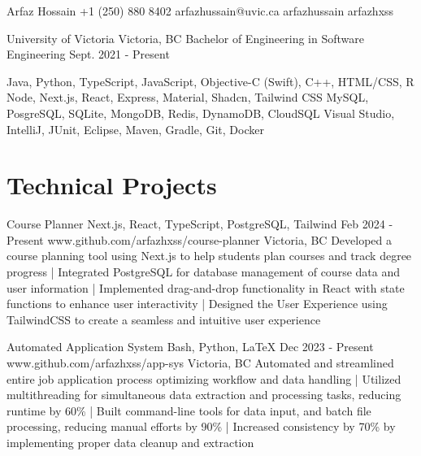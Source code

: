 \documentclass[a4paper,10pt]{article}
\begin{document}
\header
{Arfaz Hossain}				%
{+1 (250) 880 8402}			%
{arfazhussain@uvic.ca} 			%
{arfazhussain} 				%
{arfazhxss} 				%

\education
{University of Victoria}
{Victoria, BC}
{Bachelor of Engineering in Software Engineering}
{Sept. 2021 - Present}

\technicalskills
{Java, Python, TypeScript, JavaScript, Objective-C (Swift), C++, HTML/CSS, R}
{Node, Next.js, React, Express, Material, Shadcn, Tailwind CSS}
{MySQL, PosgreSQL, SQLite, MongoDB, Redis, DynamoDB, CloudSQL}
{Visual Studio, IntelliJ, JUnit, Eclipse, Maven, Gradle, Git, Docker}

\section{Technical Projects}
\projectentry
{Course Planner}
{Next.js, React, TypeScript, PostgreSQL, Tailwind}
{Feb 2024 - Present}
{www.github.com/arfazhxss/course-planner}
{Victoria, BC}
{Developed a course planning tool using Next.js to help students plan courses and track degree progress 
| Integrated PostgreSQL for database management of course data and user information 
| Implemented drag-and-drop functionality in React with state functions to enhance user interactivity 
| Designed the User Experience using TailwindCSS to create a seamless and intuitive user experience
}

\projectentry
{Automated Application System}
{Bash, Python, LaTeX}
{Dec 2023 - Present}
{www.github.com/arfazhxss/app-sys}
{Victoria, BC}
{Automated and streamlined entire job application process optimizing workflow and data handling
| Utilized multithreading for simultaneous data extraction and processing tasks, reducing runtime by 60\% 
| Built command-line tools for data input, and batch file processing, reducing manual efforts by 90\% 
| Increased consistency by 70\% by implementing proper data cleanup and extraction}

\end{document}
